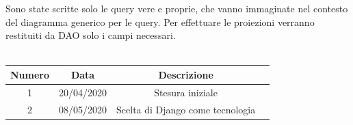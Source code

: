 Sono state scritte solo le query vere e proprie, che vanno immaginate nel contesto del diagramma generico per le query. Per effettuare le proiezioni verranno restituiti da DAO solo i campi necessari.
\newline\newline
{} \\ \\
\begin{tabular}{|c | c | c | c|} 
 	\hline
	 Numero & Data & Descrizione \\ [0.5ex] 
	\hline\hline
	1 & 20/04/2020 & Stesura iniziale \\ 
	\hline
	2 & 08/05/2020 & Scelta di Django come tecnologia \\
	\hline
\end{tabular}